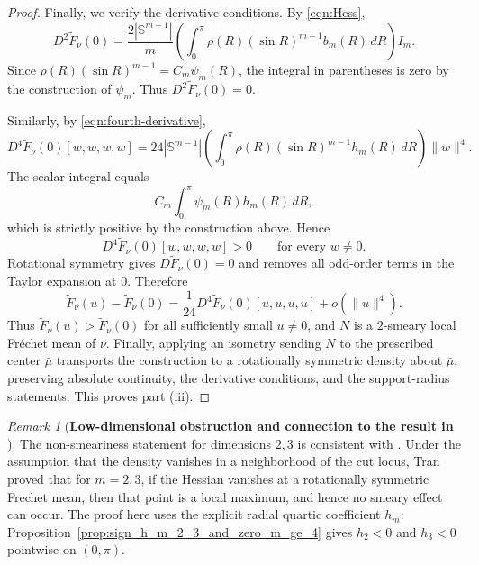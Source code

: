 \documentclass{amsart}
\theoremstyle{definition}
\theoremstyle{remark}
\newtheorem{remark}[theorem]{Remark}
\newcommand{\mubar}{\bar{\mu}}
\newcommand\0{\boldsymbol{0}}
\begin{document}
\begin{proof}
Finally, we verify the derivative conditions. By \eqref{eqn:Hess},
\[
D^2\widetilde F_\nu(0)
=
\frac{2|\mathbb S^{m-1}|}{m}
\left(
\int_0^\pi \rho(R)(\sin R)^{m-1}b_m(R)\,dR
\right)I_m.
\]
Since \(\rho(R)(\sin R)^{m-1}=C_m\psi_m(R)\), the integral in parentheses is zero by the construction of \(\psi_m\). Thus \(D^2\widetilde F_\nu(0)=0\).

Similarly, by \eqref{eqn:fourth-derivative},
\[
D^4\widetilde F_\nu(0)[w,w,w,w]
=
24|\mathbb S^{m-1}|
\left(
\int_0^\pi \rho(R)(\sin R)^{m-1}h_m(R)\,dR
\right)
\|w\|^4.
\]
The scalar integral equals
\[
C_m\int_0^\pi\psi_m(R)h_m(R)\,dR,
\]
which is strictly positive by the construction above. Hence
\[
D^4\widetilde F_\nu(0)[w,w,w,w]>0
\qquad\text{for every }w\neq0.
\]
Rotational symmetry gives \(D\widetilde F_\nu(0)=0\) and removes all odd-order terms in the Taylor expansion at \(0\). Therefore
\[
\widetilde F_\nu(u)-\widetilde F_\nu(0)
=
\frac{1}{24}D^4\widetilde F_\nu(0)[u,u,u,u]+o(\|u\|^4).
\]
Thus \(\widetilde F_\nu(u)>\widetilde F_\nu(0)\) for all sufficiently small \(u\neq0\), and \(N\) is a \(2\)-smeary local Fréchet mean of \(\nu\). Finally, applying an isometry sending \(N\) to the prescribed center \(\mubar\) transports the construction to a rotationally symmetric density about \(\mubar\), preserving absolute continuity, the derivative conditions, and the support-radius statements. This proves part (iii).
\end{proof}

\begin{remark}[\textbf{Low-dimensional obstruction and connection to the result in \citet{Tran2021CLT}}]
The non-smeariness statement for dimensions \(2,3\) is consistent with \citet[Corollary~2.7]{Tran2021CLT}. Under the assumption that the density vanishes in a neighborhood of the cut locus, Tran proved that for \(m=2,3\), if the Hessian vanishes at a rotationally symmetric Frechet mean, then that point is a local maximum, and hence no smeary effect can occur. The proof here uses the explicit radial quartic coefficient \(h_m\): Proposition~\ref{prop:sign_h_m_2_3_and_zero_m_ge_4} gives \(h_2<0\) and \(h_3<0\) pointwise on \((0,\pi)\).
\end{remark}
\end{document}
